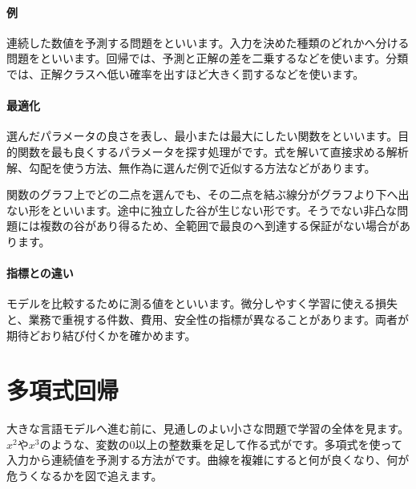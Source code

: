 \paragraph{例}
        連続した数値を予測する問題をといいます。入力を決めた種類のどれかへ分ける問題をといいます。回帰では、予測と正解の差を二乗するなどを使います。分類では、正解クラスへ低い確率を出すほど大きく罰するなどを使います。

\par
\endgroup
\medskip
\begingroup
\paragraph{最適化}
        選んだパラメータの良さを表し、最小または最大にしたい関数をといいます。目的関数を最も良くするパラメータを探す処理がです。式を解いて直接求める解析解、勾配を使う方法、無作為に選んだ例で近似する方法などがあります。

        関数のグラフ上でどの二点を選んでも、その二点を結ぶ線分がグラフより下へ出ない形をといいます。途中に独立した谷が生じない形です。そうでない非凸な問題には複数の谷があり得るため、全範囲で最良のへ到達する保証がない場合があります。

\paragraph{指標との違い}
        モデルを比較するために測る値をといいます。微分しやすく学習に使える損失と、業務で重視する件数、費用、安全性の指標が異なることがあります。両者が期待どおり結び付くかを確かめます。

\par
\endgroup
\par
\endgroup


\section{多項式回帰}
\label{sec:06-machine-learning-08}

大きな言語モデルへ進む前に、見通しのよい小さな問題で学習の全体を見ます。$x^2$や$x^3$のような、変数の0以上の整数乗を足して作る式がです。多項式を使って入力から連続値を予測する方法がです。曲線を複雑にすると何が良くなり、何が危うくなるかを図で追えます。

\begingroup
\begingroup
      \centering
\par
\endgroup
\medskip
\begingroup
